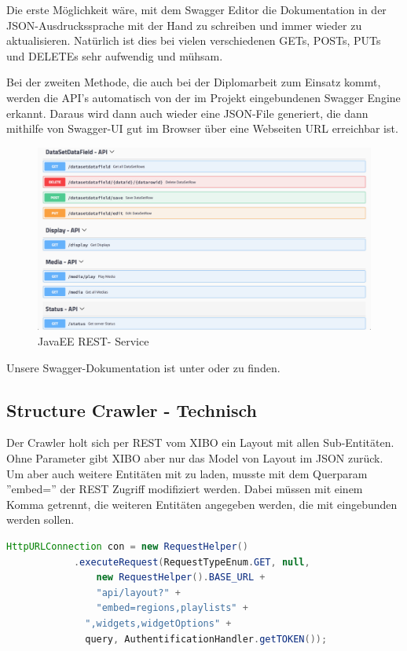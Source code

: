 Die erste Möglichkeit wäre, mit dem Swagger Editor die Dokumentation in der JSON-Ausdruckssprache mit der Hand zu schreiben und immer wieder zu aktualisieren. Natürlich ist dies bei vielen verschiedenen GETs, POSTs, PUTs und DELETEs sehr aufwendig und mühsam.

Bei der zweiten Methode, die auch bei der Diplomarbeit zum Einsatz kommt, werden die API's automatisch von der im Projekt eingebundenen Swagger Engine erkannt. Daraus wird dann auch wieder eine JSON-File generiert, die dann mithilfe von Swagger-UI gut im Browser über eine Webseiten URL erreichbar ist.

\begin{figure}[H]
\centering
\includegraphics[width=1\textwidth]{images/08_HomeDsWeb/swagger.png}
\caption{JavaEE REST- Service}
\label{img:swaggerdoku}
\end{figure}

Unsere Swagger-Dokumentation ist unter   oder  zu finden. \cite{swagger}

\subsection{Structure Crawler - Technisch}\label{sec:structurecrawlertechnical}
Der Crawler holt sich per REST vom XIBO ein Layout mit allen Sub-Entitäten. Ohne Parameter gibt XIBO aber nur das Model von Layout im JSON zurück. Um aber auch weitere Entitäten mit zu laden, musste mit dem Querparam  ''embed='' der REST Zugriff modifiziert werden. Dabei müssen mit einem Komma getrennt, die weiteren Entitäten angegeben werden, die mit eingebunden werden sollen.

\begin{lstlisting}[language=Java, caption={Crawler GET Request}]
HttpURLConnection con = new RequestHelper()
         	.executeRequest(RequestTypeEnum.GET, null,
             	new RequestHelper().BASE_URL + 
             	"api/layout?" + 
             	"embed=regions,playlists" + 
              ",widgets,widgetOptions" + 
              query, AuthentificationHandler.getTOKEN());
\end{lstlisting}

